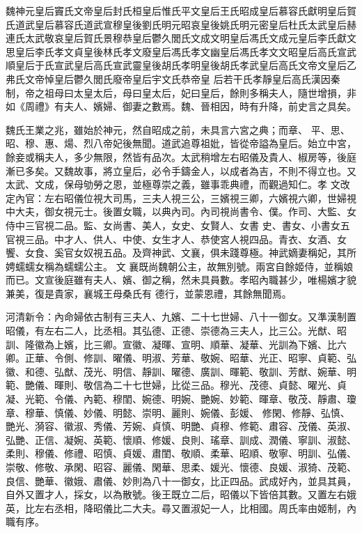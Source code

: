 
\begin{pinyinscope}

 魏神元皇后竇氏文帝皇后封氏桓皇后惟氏平文皇后王氏昭成皇后慕容氏獻明皇后賀氏道武皇后慕容氏道武宣穆皇後劉氏明元昭哀皇後姚氏明元密皇后杜氏太武皇后赫連氏太武敬哀皇后賀氏景穆恭皇后鬱久閭氏文成文明皇后馮氏文成元皇后李氏獻文思皇后李氏孝文貞皇後林氏孝文廢皇后馮氏孝文幽皇后馮氏孝文文昭皇后高氏宣武順皇后于氏宣武皇后高氏宣武靈皇後胡氏孝明皇後胡氏孝武皇后高氏文帝文皇后乙弗氏文帝悼皇后鬱久閭氏廢帝皇后宇文氏恭帝皇
 后若干氏孝靜皇后高氏漢因秦制，帝之祖母曰太皇太后，母曰皇太后，妃曰皇后，餘則多稱夫人，隨世增損，非如《周禮》有夫人、嬪婦、御妻之數焉。魏、晉相因，時有升降，前史言之具矣。



 魏氏王業之兆，雖始於神元，然自昭成之前，未具言六宮之典；而章、
 平、思、昭、穆、惠、煬、烈八帝妃後無聞。道武追尊祖妣，皆從帝謚為皇后。始立中宮，餘妾或稱夫人，多少無限，然皆有品次。太武稍增左右昭儀及貴人、椒房等，後庭漸已多矣。又魏故事，將立皇后，必令手鑄金人，以成者為吉，不則不得立也。又太武、文成，保母劬勞之恩，並極尊崇之義，雖事乖典禮，而觀過知仁。孝
 文改定內官：左右昭儀位視大司馬，三夫人視三公，三嬪視三卿，六嬪視六卿，世婦視中大夫，御女視元士。後置女職，以典內司。內司視尚書令、僕。作司、大監、女侍中三官視二品。監、女尚書、美人，女史、女賢人、女書
 史、書女、小書女五官視三品。中才人、供人、中使、女生才人、恭使宮人視四品。青衣、女酒、女饗、女食、奚官女奴視五品。及齊神武、文襄，俱未踐尊極。神武嫡妻稱妃，其所娉蠕蠕女稱為蠕蠕公主。
 文
 襄既尚魏朝公主，故無別號。兩宮自餘姬侍，並稱娘而已。文宣後庭雖有夫人、嬪、御之稱，然未具員數。孝昭內職甚少，唯楊嬪才貌兼美，復是貴家，襄城王母桑氏有
 德行，並蒙恩禮，其餘無聞焉。



 河清新令：內命婦依古制有三夫人、九嬪、二十七世婦、八十一御女。又準漢制置昭儀，有左右二人，比丞相。其弘德、正德、崇德為三夫人，比三公。光猷、昭訓、隆徽為上嬪，比三卿。宣徽、凝暉、宣明、順華、凝華、光訓為下嬪、比六卿。正華、令側、修訓、曜儀、明淑、芳華、敬婉、昭華、光正、昭寧、貞範、弘徽、和德、弘猷、茂光、明信、靜訓、曜德、廣訓、暉範、敬訓、芳猷、婉華、明範、艷儀、暉則、敬信為二十七世婦，比從三品。穆光、茂德、貞懿、曜光、貞凝、光範、令儀、內範、穆閨、婉德、明婉、艷婉、妙範、暉章、敬茂、靜肅、瓊章、穆華、慎儀、妙儀、明懿、崇明、麗則、婉儀、彭媛、
 修閑、修靜、弘慎、艷光、漪容、徽淑、秀儀、芳婉、貞慎、明艷、貞穆、修範、肅容、茂儀、英淑、弘艷、正信、凝婉、英範、懷順、修媛、良則、瑤章、訓成、潤儀、寧訓、淑懿、柔則、穆儀、修禮、昭慎、貞媛、肅閨、敬順、柔華、昭順、敬寧、明訓、弘儀、崇敬、修敬、承閑、昭容、麗儀、閑華、思柔、媛光、懷德、良媛、淑猗、茂範、良信、艷華、徽娥、肅儀、妙則為八十一御女，比正四品。武成好內，並具其員，自外又置才人，採女，以為散號。後王既立二后，昭儀以下皆倍其數。又置左右娥英，比左右丞相，降昭儀比二大夫。尋又置淑妃一人，比相國。周氏率由姬制，內職有序。




\end{pinyinscope}

